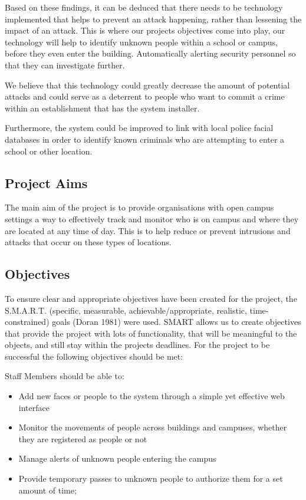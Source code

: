 \documentclass[
  english,
  a4paper,
,tablecaptionabove
]{scrartcl}
\providecommand{\tightlist}{%
  \setlength{\itemsep}{0pt}\setlength{\parskip}{0pt}}
\begin{document}
Based on these findings, it can be deduced that there needs to be
technology implemented that helps to prevent an attack happening, rather
than lessening the impact of an attack. This is where our projects
objectives come into play, our technology will help to identify unknown
people within a school or campus, before they even enter the building.
Automatically alerting security personnel so that they can investigate
further.

We believe that this technology could greatly decrease the amount of
potential attacks and could serve as a deterrent to people who want to
commit a crime within an establishment that has the system installer.

Furthermore, the system could be improved to link with local police
facial databases in order to identify known criminals who are attempting
to enter a school or other location.

\newpage

\hypertarget{project-aims}{%
\subsection{Project Aims}\label{project-aims}}

The main aim of the project is to provide organisations with open campus
settings a way to effectively track and monitor who is on campus and
where they are located at any time of day. This is to help reduce or
prevent intrusions and attacks that occur on these types of locations.

\hypertarget{objectives}{%
\subsection{Objectives}\label{objectives}}

To ensure clear and appropriate objectives have been created for the
project, the S.M.A.R.T. (specific, measurable, achievable/appropriate,
realistic, time-constrained) goals (Doran 1981) were used. SMART allows
us to create objectives that provide the project with lots of
functionality, that will be meaningful to the objects, and still stay
within the projects deadlines. For the project to be successful the
following objectives should be met:

Staff Members should be able to:

\begin{itemize}
\tightlist
\item
  Add new faces or people to the system through a simple yet effective
  web interface
\item
  Monitor the movements of people across buildings and campuses, whether
  they are registered as people or not
\item
  Manage alerts of unknown people entering the campus
\item
  Provide temporary passes to unknown people to authorize them for a set
  amount of time;
\end{itemize}
\end{document}
